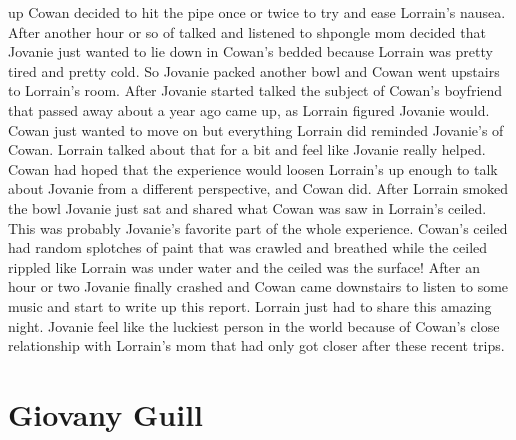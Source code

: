 \documentclass[12pt]{book}
\begin{document}
up Cowan decided to hit the pipe once or twice to try and ease Lorrain's nausea. After another hour or so of talked and listened to shpongle mom decided that Jovanie just wanted to lie down in Cowan's bedded because Lorrain was pretty tired and pretty cold. So Jovanie packed another bowl and Cowan went upstairs to Lorrain's room. After Jovanie started talked the subject of Cowan's boyfriend that passed away about a year ago came up, as Lorrain figured Jovanie would. Cowan just wanted to move on but everything Lorrain did reminded Jovanie's of Cowan. Lorrain talked about that for a bit and feel like Jovanie really helped. Cowan had hoped that the experience would loosen Lorrain's up enough to talk about Jovanie from a different perspective, and Cowan did. After Lorrain smoked the bowl Jovanie just sat and shared what Cowan was saw in Lorrain's ceiled. This was probably Jovanie's favorite part of the whole experience. Cowan's ceiled had random splotches of paint that was crawled and breathed while the ceiled rippled like Lorrain was under water and the ceiled was the surface! After an hour or two Jovanie finally crashed and Cowan came downstairs to listen to some music and start to write up this report. Lorrain just had to share this amazing night. Jovanie feel like the luckiest person in the world because of Cowan's close relationship with Lorrain's mom that had only got closer after these recent trips.



\chapter{Giovany Guill}
\end{document}
